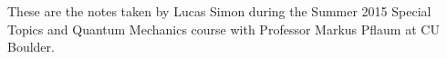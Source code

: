 \documentclass[../notes.tex]{subfiles}
\begin{document}
These are the notes taken by Lucas Simon during the Summer 2015 Special Topics and Quantum Mechanics course with Professor Markus Pflaum at CU Boulder.
\end{document}

